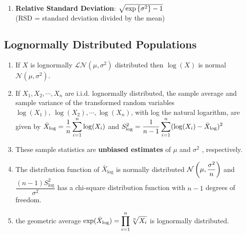 \begin{enumerate}
    \item \textbf{Relative Standard Deviation}: $\sqrt{\exp\left\{\sigma^2\right\} - 1}$
    \hfill \cite{statistics/book/Statistics-for-Data-Scientists/Maurits-Kaptein}
    \\
    (RSD = standard deviation divided by the mean)
    \hfill \cite{statistics/book/Statistics-for-Data-Scientists/Maurits-Kaptein}
\end{enumerate}





\subsection{Lognormally Distributed Populations}

\begin{enumerate}
    \item If $X$ is lognormally $\mathcal{L N} (\mu, \sigma^2)$ distributed then $\log(X)$ is normal $\mathcal{N} (\mu, \sigma^2)$.
    \hfill \cite{statistics/book/Statistics-for-Data-Scientists/Maurits-Kaptein}

    \item If $X_1 , X_2, \cdots , X _n$ are i.i.d. lognormally distributed, the sample average and sample variance of the transformed random variables $\log (X_1),\ \log (X_2) , \cdots , \log (X_ n )$, with log the natural logarithm, are given by
    $
        \bar{X}_{\log} = \dfrac{1}{n} \displaystyle\sum^n _{i=1} \log (X _i )
    $
    and
    $
        S^2 _{\log} = \dfrac{1 }{n - 1} \displaystyle\sum^n _{i=1} (\log (X _i ) - \bar{X}_{\log} )^2
    $
    \hfill \cite{statistics/book/Statistics-for-Data-Scientists/Maurits-Kaptein}

    \item These sample statistics are \textbf{unbiased estimates} of $\mu$ and $\sigma^ 2$ , respectively.
    \hfill \cite{statistics/book/Statistics-for-Data-Scientists/Maurits-Kaptein}

    \item The distribution function of $\bar{X}_{\log}$ is normally distributed $\mathcal{N} \left(\mu, \dfrac{\sigma ^ 2}{n}\right)$ and $\dfrac{(n - 1) S^2 _{\log}}{\sigma ^ 2}$ has a chi-square distribution function with $n - 1$ degrees of freedom.
    \hfill \cite{statistics/book/Statistics-for-Data-Scientists/Maurits-Kaptein}

    \item the geometric average $\exp ( \bar{X}_{\log} ) = \displaystyle\prod ^n _{i=1} \sqrt[n]{{X}_ i}$ is lognormally distributed.
    \hfill \cite{statistics/book/Statistics-for-Data-Scientists/Maurits-Kaptein}
\end{enumerate}





